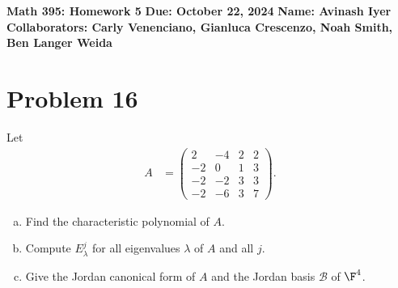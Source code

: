\documentclass[10pt]{mypackage}
\begin{document}
\RaggedRight
\begin{center}
  \textbf{Math 395: Homework 5}\break
  \textbf{Due: October 22, 2024}\break
  \textbf{Name: Avinash Iyer}\break
  \textbf{Collaborators: Carly Venenciano, Gianluca Crescenzo, Noah Smith, Ben Langer Weida}
\end{center}
\section{Problem 16}%
\begin{problem}
  Let
  \begin{align*}
    A &= \begin{pmatrix}2 & -4 & 2 & 2 \\ -2 & 0 & 1 & 3 \\ -2 & -2 & 3 & 3 \\ -2 & -6 & 3 & 7\end{pmatrix}.
  \end{align*}
  \begin{enumerate}[(a)]
    \item Find the characteristic polynomial of $A$.
    \item Compute $E_{\lambda}^{j}$ for all eigenvalues $\lambda$ of $A$ and all $j$.
    \item Give the Jordan canonical form of $A$ and the Jordan basis $\mathcal{B}$ of $\F^4$.
  \end{enumerate}
\end{problem}
\end{document}
